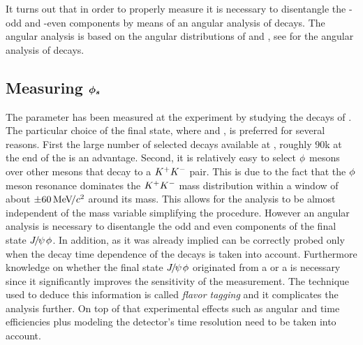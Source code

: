 It turns out that in order to properly measure \phis it is necessary to disentangle the \CP-odd and \CP-even
components by means of an angular analysis of \BsJpsiPhi decays. The angular analysis is based on the
angular distributions of \phiKK and \Jpsimumu, see  for the angular analysis
of \BsJpsiKst decays.

\subsection{Measuring $\boldsymbol{\phi_{s}}$}
\label{measuring_phis}

The parameter \phis has been measured at the \lhcb experiment by studying the decays of \BsJpsiPhi \cite{phis-3fb-paper}.
The particular choice of the final state, where \phiKK and \Jpsimumu, is preferred for several reasons. First the large number
of selected \BsJpsiPhi decays available at \lhcb, roughly $90$k at the end of the \runtwo is an advantage. Second, it is relatively
easy to select $\phi$ mesons over other mesons that decay to a $K^+K^-$ pair. This is due to the fact that the $\phi$ meson resonance dominates
the $K^+K^-$ mass distribution within a window of about $\pm 60 {\mathrm{\,Me\kern -0.1em V\!/}c^2}$ around its mass. This allows for the analysis to be
almost independent of the \mKK mass variable simplifying the procedure. However an angular analysis is necessary
to disentangle the odd and even \CP components of the final state ${J\mskip -3mu/\mskip -2mu\psi\mskip 2mu}\phi$.
In addition, as it was already implied \phis can be correctly probed only when the decay time dependence of the \BsJpsiPhi decays is taken into
account. Furthermore knowledge on whether the final state ${J\mskip -3mu/\mskip -2mu\psi\mskip 2mu}\phi$ originated from a \Bs or a \Bsb is necessary since it
significantly improves the sensitivity of the \phis measurement. The technique used to deduce this information is called {\it flavor tagging}
and it complicates the analysis further. On top of that experimental effects such as angular and time efficiencies plus modeling the
\lhcb detector's time resolution need to be taken into account.

